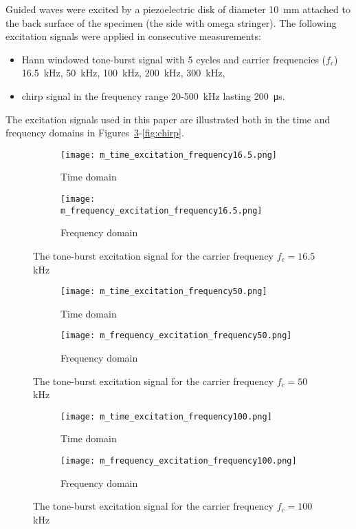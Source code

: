 \documentclass[times,final]{elsarticle}
\begin{document}
Guided waves were excited by a piezoelectric disk of diameter \SI{10}{\milli\meter} attached to the back surface of the specimen (the side with omega stringer).
The following excitation signals were applied in consecutive measurements:
\begin{itemize}
\item Hann windowed tone-burst signal with 5 cycles and carrier frequencies (\(f_c\)) \SI{16.5}{\kilo\hertz}, \SI{50}{\kilo\hertz}, \SI{100}{\kilo\hertz}, \SI{200}{\kilo\hertz}, \SI{300}{\kilo\hertz},
\item chirp signal in the frequency range \num{20}-\SI{500}{\kilo\hertz} lasting \SI{200}{\micro\second}.
\end{itemize}
{\color{red}The excitation signals used in this paper are illustrated both in the time and frequency domains in Figures~\ref{fig:exc16_5}-\ref{fig:chirp}}.
\begin{figure} [h!]
	\centering
		\begin{subfigure}[b]{0.49\textwidth}
		\texttt{[image: m\_time\_excitation\_frequency16.5.png]}
		\caption{Time domain}
		\label{fig:time_exc16_5}
	\end{subfigure}
	\begin{subfigure}[b]{0.49\textwidth}
		\texttt{[image: m\_frequency\_excitation\_frequency16.5.png]}
		\caption{Frequency domain}
		\label{fig:freq_exc16_5}
	\end{subfigure}
	\caption{The tone-burst excitation signal for the carrier frequency $f_c=16.5$ kHz}
	\label{fig:exc16_5}
\end{figure}
\begin{figure} [h!]
	\centering
		\begin{subfigure}[b]{0.49\textwidth}
		\texttt{[image: m\_time\_excitation\_frequency50.png]}
		\caption{Time domain}
		\label{fig:time_exc50}
	\end{subfigure}
	\begin{subfigure}[b]{0.49\textwidth}
		\texttt{[image: m\_frequency\_excitation\_frequency50.png]}
		\caption{Frequency domain}
		\label{fig:freq_exc50}
	\end{subfigure}
	\caption{The tone-burst excitation signal for the carrier frequency $f_c=50$ kHz}
	\label{fig:exc50}
\end{figure}
\begin{figure} [h!]
	\centering
		\begin{subfigure}[b]{0.49\textwidth}
		\texttt{[image: m\_time\_excitation\_frequency100.png]}
		\caption{Time domain}
		\label{fig:time_exc100}
	\end{subfigure}
	\begin{subfigure}[b]{0.49\textwidth}
		\texttt{[image: m\_frequency\_excitation\_frequency100.png]}
		\caption{Frequency domain}
		\label{fig:freq_exc100}
	\end{subfigure}
	\caption{The tone-burst excitation signal for the carrier frequency $f_c=100$ kHz}
	\label{fig:exc100}
\end{figure}
\end{document}

